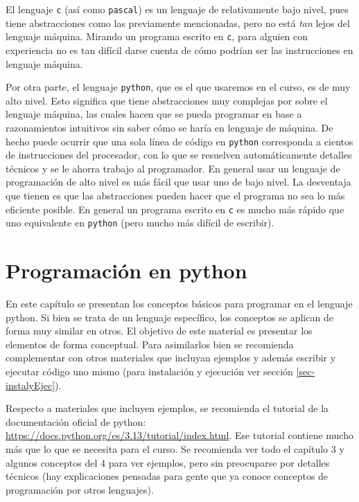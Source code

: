\documentclass[a4paper, 12pt]{report}
\begin{document}
El lenguaje {\tt c} (así como {\tt pascal}) es un lenguaje de relativamente bajo nivel, pues tiene abstracciones como las previamente mencionadas, pero no está {\sl tan} lejos del lenguaje máquina. Mirando un programa escrito en {\tt c}, para alguien con experiencia no es tan difícil darse cuenta de cómo podrían ser las instrucciones en lenguaje máquina.

Por otra parte, el lenguaje {\tt python}, que es el que usaremos en el curso, es de muy alto nivel. Esto significa que tiene abstracciones muy complejas por sobre el lenguaje máquina, las cuales hacen que se pueda programar en base a razonamientos intuitivos sin saber cómo se haría en lenguaje de máquina. De hecho puede ocurrir que una sola línea de código en {\tt python} corresponda a cientos de instrucciones del procesador, con lo que se resuelven automáticamente detalles técnicos y se le ahorra trabajo al programador. En general usar un lenguaje de programación de alto nivel es más fácil que usar uno de bajo nivel. La desventaja que tienen es que las abstracciones pueden hacer que el programa no sea lo más eficiente posible. En general un programa escrito en {\tt c} es mucho más rápido que uno equivalente en {\tt python} (pero mucho más difícil de escribir).

\chapter{Programación en python}

En este capítulo se presentan los conceptos básicos para programar en el lenguaje python. Si bien se trata de un lenguaje específico, los conceptos se aplican de forma muy similar en otros. El objetivo de este material es presentar los elementos de forma conceptual. Para asimilarlos bien se recomienda complementar con otros materiales que incluyan ejemplos y además escribir y ejecutar código uno mismo (para instalación y ejecución ver sección \ref{sec-instalyEjec}).

Respecto a materiales que incluyen ejemplos, se recomienda el tutorial de la documentación oficial de python: \href{https://docs.python.org/es/3.13/tutorial/index.html}{https://docs.python.org/es/3.13/tutorial/index.html}. Ese tutorial contiene mucho más que lo que se necesita para el curso. Se recomienda ver todo el capítulo 3 y algunos conceptos del 4 para ver ejemplos, pero sin preocuparse por detalles técnicos (hay explicaciones pensadas para gente que ya conoce conceptos de programación por otros lenguajes).
\end{document}
